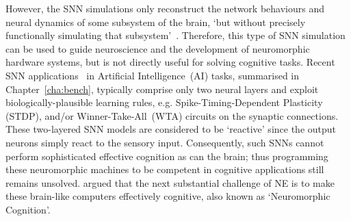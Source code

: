 However, the SNN simulations only reconstruct the network behaviours and neural dynamics of some subsystem of the brain, `but without precisely functionally simulating that subsystem'~\citep{de2010world}.
Therefore, this type of SNN simulation can be used to guide neuroscience and the development of neuromorphic hardware systems, but is not directly useful for solving cognitive tasks.
Recent SNN applications~\citep{bill2014compound,diehl2015unsupervised} in Artificial Intelligence~(AI) tasks, summarised in Chapter~\ref{cha:bench}, typically comprise only two neural layers and exploit biologically-plausible learning rules, e.g. Spike-Timing-Dependent Plasticity (STDP), and/or Winner-Take-All~(WTA) circuits on the synaptic connections.
These two-layered SNN models are considered to be `reactive' since the output neurons simply react to the sensory input.
Consequently, such SNNs cannot perform sophisticated effective cognition as can the brain;
thus programming these neuromorphic machines to be competent in cognitive applications still remains unsolved.
\citet{indiveri2009artificial} argued that the next substantial challenge of NE is to make these brain-like computers effectively cognitive, also known as `Neuromorphic Cognition'.


%
%

